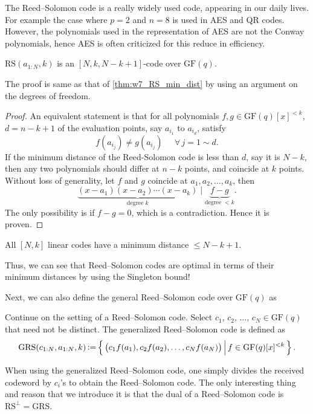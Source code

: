 \begin{remark}
    The Reed--Solomon code is a really widely used code, appearing in our daily lives. For example the case where $p=2$ and $n=8$ is used in AES and QR codes. However, the polynomials used in the representation of AES are not the Conway polynomials, hence AES is often criticized for this reduce in efficiency.
\end{remark}

\begin{theorem}
    $\mathrm{RS}(a_{1:N},k)$ is an $[N,k,N-k+1]$-code over $\mathrm{GF}(q)$.
\end{theorem}
The proof is same as that of \autoref{thm:w7_RS_min_dist} by using an argument on the degrees of freedom.
\begin{proof}
    An equivalent statement is that for all polynomials $f,g\in\mathrm{GF}(q)[x]^{<k}$, $d=n-k+1$ of the evaluation points, say $a_{i_1}$ to $a_{i_d}$, satisfy
    \begin{equation*}
        f(a_{i_j})\neq g(a_{i_j})\;\;\;\;\;\forall\,j=1\sim d.
    \end{equation*}
    If the minimum distance of the Reed-Solomon code is less than $d$, say it is $N-k$, then any two polynomials should differ at $n-k$ points, and coincide at $k$ points. Without loss of generality, let $f$ and $g$ coincide at $a_1, a_2,\ldots,a_k$, then
    \begin{equation*}
        \underbrace{(x-a_1)(x-a_2)\cdots(x-a_k)}_{\text{degree }k}\mid \underbrace{f-g}_{\text{degree }<k}.
    \end{equation*}
    The only possibility is if $f-g=0$, which is a contradiction. Hence it is proven.
\end{proof}
\begin{lemma}
    All $[N,k]$ linear codes have a minimum distance $\le N-k+1$.
\end{lemma}
Thus, we can see that Reed--Solomon codes are optimal in terms of their minimum distances by using the Singleton bound!

Next, we can also define the general Reed--Solomon code over $\mathrm{GF}(q)$ as
\begin{definition}
    Continue on the setting of a Reed--Solomon code. Select $c_1$, $c_2$, $\ldots$, $c_N\in\mathrm{GF}(q)$ that need not be distinct. The generalized Reed--Solomon code is defined as
    \begin{equation}
        \mathrm{GRS}(c_{1:N},a_{1:N},k) \operatorname{\vcentcolon=} \left\{\,{\left(c_1f(a_1),c_2f(a_2),\ldots,c_Nf(a_N)\right)}\,\middle\vert\,{f\in\mathrm{GF}(q)[x]^{<k}}\,\right\}.
    \end{equation}
\end{definition}
When using the generalized Reed--Solomon code, one simply divides the received codeword by $c_i$'s to obtain the Reed--Solomon code. The only interesting thing and reason that we introduce it is that the dual of a Reed--Solomon code is $\mathrm{RS}^\perp = \mathrm{GRS}$.

